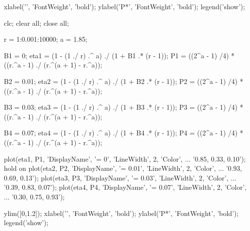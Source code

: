 \begin{verbatim*}
xlabel('\eta', 'FontWeight', 'bold');
ylabel('P*', 'FontWeight', 'bold');
legend('show');

clc; clear all; close all;

r = 1:0.001:10000;
a = 1.85;

B1 = 0;
eta1 = (1 - (1 ./ r) .^ a) ./ (1 + B1 .* (r - 1));
P1 = ((2^a - 1) /4) * ((r.^a - 1) ./ (r.^(a + 1) - r.^a));

B2 = 0.01;
eta2 = (1 - (1 ./ r) .^ a) ./ (1 + B2 .* (r - 1));
P2 = ((2^a - 1) /4) * ((r.^a - 1) ./ (r.^(a + 1) - r.^a));

B3 = 0.03;
eta3 = (1 - (1 ./ r) .^ a) ./ (1 + B3 .* (r - 1));
P3 = ((2^a - 1) /4) * ((r.^a - 1) ./ (r.^(a + 1) - r.^a));

B4 = 0.07;
eta4 = (1 - (1 ./ r) .^ a) ./ (1 + B4 .* (r - 1));
P4 = ((2^a - 1) /4) * ((r.^a - 1) ./ (r.^(a + 1) - r.^a));

plot(eta1, P1, 'DisplayName', '\beta = 0', 'LineWidth', 2, 'Color', ...
    '0.85, 0.33, 0.10');
hold on
plot(eta2, P2, 'DisplayName', '\beta = 0.01', 'LineWidth', 2, 'Color', ...
    '0.93, 0.69, 0.13');
plot(eta3, P3, 'DisplayName', '\beta = 0.03', 'LineWidth', 2, 'Color', ...
    '0.39, 0.83, 0.07');
plot(eta4, P4, 'DisplayName', '\beta = 0.07', 'LineWidth', 2, 'Color', ...
    '0.30, 0.75, 0.93');

ylim([0,1.2]);
xlabel('\eta', 'FontWeight', 'bold');
ylabel('P*', 'FontWeight', 'bold');
legend('show');
\end{verbatim*}

